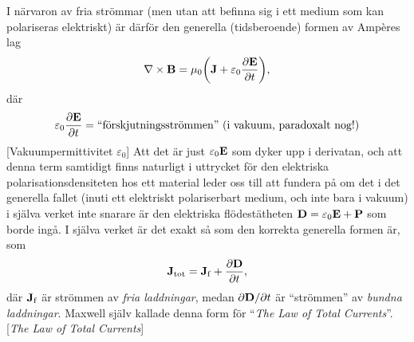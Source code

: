 I n{\"a}rvaron av fria str{\"o}mmar (men utan att befinna sig i ett medium som
kan polariseras elektriskt) {\"a}r d{\"a}rf{\"o}r den generella (tidsberoende)
formen av Amp{\`e}res lag
$$
  \nabla\times{\bf B}=\mu_0\bigg({\bf J}
    +\varepsilon_0{{\partial{\bf E}}\over{\partial t}}\bigg),
$$
d{\"a}r
$$
  \varepsilon_0{{\partial{\bf E}}\over{\partial t}}
    =\hbox{``f{\"o}rskjutningsstr{\"o}mmen'' (i vakuum, paradoxalt nog!)}
$$
[Vakuumpermittivitet $\varepsilon_0$]
Att det {\"a}r just $\varepsilon_0{\bf E}$ som dyker upp i derivatan, och att
denna term samtidigt finns naturligt i uttrycket f{\"o}r den elektriska
polarisationsdensiteten  hos
ett material leder oss
till att fundera p{\aa} om det i det generella fallet (inuti ett elektriskt
polariserbart medium, och inte bara i vakuum) i sj{\"a}lva verket inte
snarare {\"a}r den elektriska fl{\"o}dest{\"a}theten ${\bf D}=\varepsilon_0
{\bf E}+{\bf P}$ som borde ing{\aa}.
I sj{\"a}lva verket {\"a}r det exakt s{\aa} som den
korrekta generella formen {\"a}r, som
$$
  {\bf J}_{\rm tot} = {\bf J}_{\rm f}+{{\partial{\bf D}}\over{\partial t}},
$$
d{\"a}r ${\bf J}_{\rm f}$ {\"a}r str{\"o}mmen av {\it fria laddningar}, medan
${{\partial{\bf D}}/{\partial t}}$ {\"a}r ``str{\"o}mmen'' av {\it bundna
laddningar}. Maxwell sj{\"a}lv kallade denna form f{\"o}r ``{\it The Law of
Total Currents}''.
[{{\it The Law of Total Currents}}]

